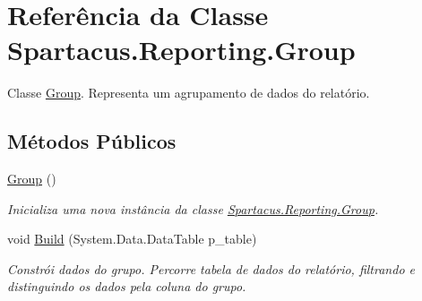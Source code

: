 \hypertarget{classSpartacus_1_1Reporting_1_1Group}{\section{Referência da Classe Spartacus.\+Reporting.\+Group}
\label{classSpartacus_1_1Reporting_1_1Group}
}


Classe \hyperlink{classSpartacus_1_1Reporting_1_1Group}{Group}. Representa um agrupamento de dados do relatório.  


\subsection*{Métodos Públicos}
\begin{DoxyCompactItemize}
\item 
\hyperlink{classSpartacus_1_1Reporting_1_1Group_a5f1e42a765a1af89a49a873f6d498179}{Group} ()
\begin{DoxyCompactList}\small\item\em Inicializa uma nova instância da classe \hyperlink{classSpartacus_1_1Reporting_1_1Group}{Spartacus.\+Reporting.\+Group}. \end{DoxyCompactList}\item 
void \hyperlink{classSpartacus_1_1Reporting_1_1Group_a2c6db24cd887c2aefc98cb04cf020c30}{Build} (System.\+Data.\+Data\+Table p\+\_\+table)
\begin{DoxyCompactList}\small\item\em Constrói dados do grupo. Percorre tabela de dados do relatório, filtrando e distinguindo os dados pela coluna do grupo. \end{DoxyCompactList}\end{DoxyCompactItemize}

